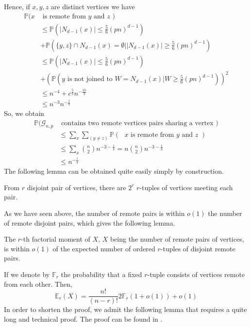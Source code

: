 	Hence, if $x, y, z$ are distinct vertices we have
	\begin{align}
		\mathbb{P}(x&\text{ is remote from $y$ and $z$ }) 						\\	
		&\leq \mathbb{P}(|N_{d-1}(x)|\leq \frac{5}{6} (pn)^{d-1}) 					\\
		&+\mathbb{P}(\{y, z\} \cap N_{d-1}(x) = \emptyset | |N_{d-1}(x)| \geq \frac{5}{6}(pn)^{d-1} )	\\
		&\leq \mathbb{P}(|N_{d-1}(x)|\leq \frac{5}{6} (pn)^{d-1}) 					\\				
		&+(\mathbb{P}(\text{$y$ is not joined to } W = N_{d-1}(x) | W \geq \frac{5}{6} (pn)^{d-1}))^2	\\
		&\leq n^{-4} + c^{\frac{5}{3}}n^{-\frac{10}{3}}							\\
		&\leq n^{-3}n^{-\frac{1}{4}}
	\end{align}
	So, we obtain
	\begin{align}
		\mathbb{P}(\mathcal{G}_{n, p} &\text{ contains two remote vertices pairs sharing a vertex })	\\
			&\leq \sum_x\sum_{(y \neq z)}\mathbb{P}(\text{ $x$ is remote from $y$ and $z$ })		\\
			&\leq \sum_x \binom{n}{2}n^{-3-\frac{1}{4}} = n\binom{n}{2}n^{-3-\frac{1}{4}}		\\
			&\leq n^{-\frac{1}{4}}
	\end{align}
	The following lemma can be obtained quite easily simply by construction.
	\begin{lemma}
		From $r$ disjoint pair of vertices, there are $2^r$ $r$-tuples of vertices meeting each pair.
	\end{lemma}
	As we have seen above, the number of remote pairs is within $o(1)$ the number of remote disjoint pairs, which gives the following lemma.
	\begin{lemma}
		The $r$-th factorial moment of $X$, $X$ being the number of remote pairs of vertices, is within $o(1)$ of the expected number of ordered $r$-tuples of disjoint remote pairs.
	\end{lemma}
	If we denote by $\mathbb{F}_r$ the probability that a fixed $r$-tuple consists of vertices remote from each other.
	Then,
	\begin{equation}
		\mathbb{E}_r(X) = \frac{n!}{(n-r)!}2\mathbb{F}_r(1+o(1)) + o(1)
	\end{equation}
	In order to shorten the proof, we admit the following lemma that requires a quite long and technical proof. The proof can be found in \cite{Bollob81}.
